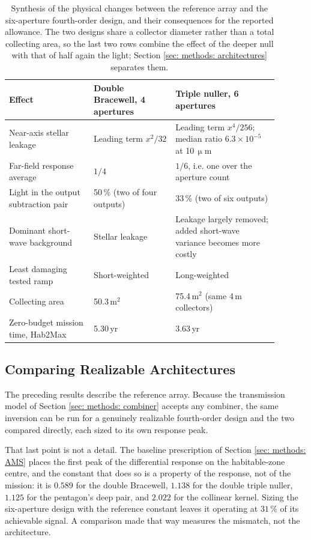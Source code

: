 \documentclass[12pt,a4paper]{article}
\numberwithin{equation}{section}
\numberwithin{figure}{section}
\numberwithin{table}{section}
\begin{document}
\begin{table}[htbp]
\centering
\begin{tabular}{@{}p{0.28\linewidth}p{0.27\linewidth}p{0.34\linewidth}@{}}
\toprule
Effect & Double Bracewell, 4 apertures & Triple nuller, 6 apertures \\
\midrule
Near-axis stellar leakage & Leading term $x^2/32$ & Leading term $x^4/256$; median ratio $6.3\times10^{-5}$ at 10\,$\upmu$m \\
Far-field response average & $1/4$ & $1/6$, i.e. one over the aperture count \\
Light in the output subtraction pair & 50\,\% (two of four outputs) & 33\,\% (two of six outputs) \\
Dominant short-wave background & Stellar leakage & Leakage largely removed; added short-wave variance becomes more costly \\
Least damaging tested ramp & Short-weighted & Long-weighted \\
Collecting area & 50.3\,m$^2$ & 75.4\,m$^2$ (same 4\,m collectors) \\
Zero-budget mission time, Hab2Max & 5.30\,yr & 3.63\,yr \\
\bottomrule
\end{tabular}
\caption{Synthesis of the physical changes between the reference array and the six-aperture fourth-order design, and their consequences for the reported allowance. The two designs share a collector diameter rather than a total collecting area, so the last two rows combine the effect of the deeper null with that of half again the light; Section \ref{sec: methods: architectures} separates them.}
\label{tab: null order synthesis}
\end{table}

\subsection{Comparing Realizable Architectures} \label{sec: tse: architecture}
The preceding results describe the reference array. Because the transmission model of Section \ref{sec: methods: combiner} accepts any combiner, the same inversion can be run for a genuinely realizable fourth-order design and the two compared directly, each sized to its own response peak.

That last point is not a detail. The baseline prescription of Section \ref{sec: methods: AMS} places the first peak of the differential response on the habitable-zone centre, and the constant that does so is a property of the response, not of the mission: it is $0.589$ for the double Bracewell, $1.138$ for the double triple nuller, $1.125$ for the pentagon's deep pair, and $2.022$ for the collinear kernel. Sizing the six-aperture design with the reference constant leaves it operating at $31\,\%$ of its achievable signal. A comparison made that way measures the mismatch, not the architecture.
\end{document}
